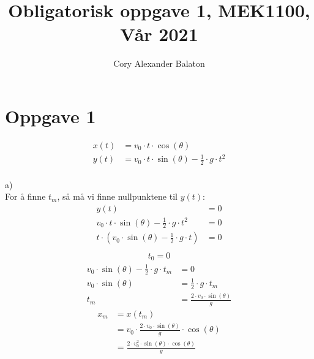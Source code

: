 \documentclass[12pt, a4paper]{article}
\title{Obligatorisk oppgave 1, MEK1100, Vår 2021}
\author{Cory Alexander Balaton}
\date{}
\begin{document}
\maketitle 
\newpage


\section*{Oppgave 1}
\begin{equation*}
    \begin{split}
        x(t) &= v_0 \cdot t \cdot \cos(\theta) \\
        y(t) &= v_0 \cdot t \cdot \sin(\theta) - \frac{1}{2} \cdot g \cdot t^2 
    \end{split}
\end{equation*} \\
a) \\
For å finne $t_m$, så må vi finne nullpunktene til $y(t)$:
\begin{equation}
    \begin{split}
                                                                  y(t) &= 0 \\
        v_0 \cdot t \cdot \sin(\theta) - \frac{1}{2} \cdot g \cdot t^2 &= 0 \\
        t \cdot (v_0 \cdot \sin(\theta) - \frac{1}{2} \cdot g \cdot t) &= 0 \\
    \end{split}
\end{equation}
\begin{equation}
    \begin{split}
        t_0 = 0
    \end{split}
\end{equation}
\begin{equation}
    \begin{split}
        v_0 \cdot \sin(\theta) - \frac{1}{2} \cdot g \cdot t_m &= 0 \\
                                      v_0 \cdot \sin(\theta) &= \frac{1}{2} \cdot g \cdot t_m \\
                                                         t_m &= \frac{2 \cdot v_0 \cdot \sin(\theta)}{g}
    \end{split}
\end{equation}
\begin{equation}
    \begin{split}
        x_m &= x(t_m) \\
            &= v_0 \cdot \frac{2 \cdot v_0 \cdot \sin(\theta)}{g} \cdot \cos(\theta) \\
            &= \frac{2 \cdot v_0^2 \cdot \sin(\theta) \cdot \cos(\theta)}{g}
    \end{split}
\end{equation}
\end{document}
